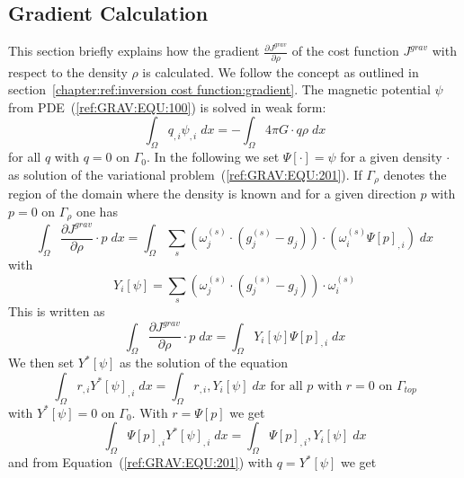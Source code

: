 \subsection{Gradient Calculation}
This section briefly explains how the gradient
$\frac{\partial J^{grav}}{\partial \rho}$ of the cost function $J^{grav}$ with
respect to the density $\rho$ is calculated. We follow the concept as outlined in section~\ref{chapter:ref:inversion cost function:gradient}.
The magnetic potential $\psi$ from PDE~(\ref{ref:GRAV:EQU:100}) is solved in
weak form:
\begin{equation}\label{ref:GRAV:EQU:201}
\int_{\Omega} q_{,i} \psi_{,i} \; dx  = - \int_{\Omega}  4\pi G \cdot q \rho\; dx 
\end{equation} 
for all $q$ with $q=0$ on $\Gamma_0$.
In the following we set $\Psi[\cdot]=\psi$ for a given density $\cdot$ as
solution of the variational problem~(\ref{ref:GRAV:EQU:201}).
If $\Gamma_{\rho}$ denotes the region of the domain where the density is known
and for a given direction $p$ with $p=0$ on $\Gamma_{\rho}$ one has
\begin{equation}\label{ref:GRAV:EQU:201aa}
\int_{\Omega}   \frac{\partial J^{grav}}{\partial \rho} \cdot p \; dx  =  \int_{\Omega}  
\sum_{s} (\omega^{(s)}_j \cdot 
(g^{(s)}_j-g_{j}) ) \cdot ( \omega^{(s)}_i \Psi[p]_{,i})  \; dx  
\end{equation} 
with 
\begin{equation}\label{ref:GRAV:EQU:202c}
Y_i[\psi]=  \sum_{s} (\omega^{(s)}_j \cdot 
(g^{(s)}_j-g_{j}) ) \cdot  \omega^{(s)}_i
\end{equation} 
This is written as 
\begin{equation}\label{ref:GRAV:EQU:202cc}
\int_{\Omega}   \frac{\partial J^{grav}}{\partial \rho} \cdot p \;  dx  = \int_{\Omega}  
Y_i[\psi] \Psi[p]_{,i} \; dx  
\end{equation} 
We then set $Y^*[\psi]$ as the solution of the equation 
\begin{equation}\label{ref:GRAV:EQU:202d}
\int_{\Omega} r_{,i} Y^*[\psi]_{,i} \; dx  =  \int_{\Omega} r_{,i} ,Y_i[\psi]  \; dx  \mbox{ for all } p \mbox{ with } r=0 \mbox{ on } \Gamma_{top}
\end{equation} 
with $Y^*[\psi]=0$ on $\Gamma_0$. With $r=\Psi[p]$ we get
\begin{equation}\label{ref:GRAV:EQU:202dd}
\int_{\Omega} \Psi[p]_{,i} Y^*[\psi]_{,i} \; dx  =  \int_{\Omega} \Psi[p]_{,i} ,Y_i[\psi]  \; dx
\end{equation} 
and from Equation~(\ref{ref:GRAV:EQU:201}) with $q=Y^*[\psi]$ we get
